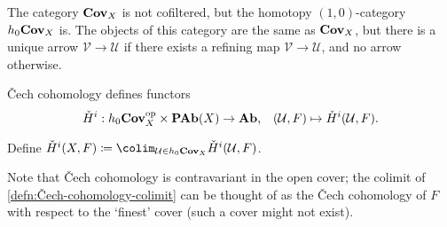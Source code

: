\begin{exc}[name={Additional exercise~17.3}]
The category \(\mathbf{Cov}_{X}\) is not cofiltered, but the homotopy \((1,0)\)-category \(h_0\mathbf{Cov}_{X}\) is.
The objects of this category are the same as \(\mathbf{Cov}_{X}\), but there is a unique arrow \(\mathcal V\to\mathcal U\) if there exists a refining map \(\mathcal V\to\mathcal U\), and no arrow otherwise.
\end{exc}

\begin{exc}[name={Additional exercise~17.4}]
Čech cohomology defines functors
\[ \check{H}^i \colon h_0\catOpenCover{X}\opp\times\catAbelianPresheaf(X)\to\catAbelianGroup\text{,} \quad (\mathcal U,F)\mapsto\check{H}^i(\mathcal U,F)\text{.} \]
\end{exc}

\begin{defn}\label{defn:Čech-cohomology-colimit}
Define \(\check{H}^i(X,F)\coloneq\colim_{\mathcal U\in h_0\catOpenCover{X}}\check{H}^i(\mathcal U,F)\).
\end{defn}

\begin{rmk}
Note that Čech cohomology is contravariant in the open cover; the colimit of \cref{defn:Čech-cohomology-colimit} can be thought of as the Čech cohomology of \(F\) with respect to the `finest' cover (such a cover might not exist).
\end{rmk}


